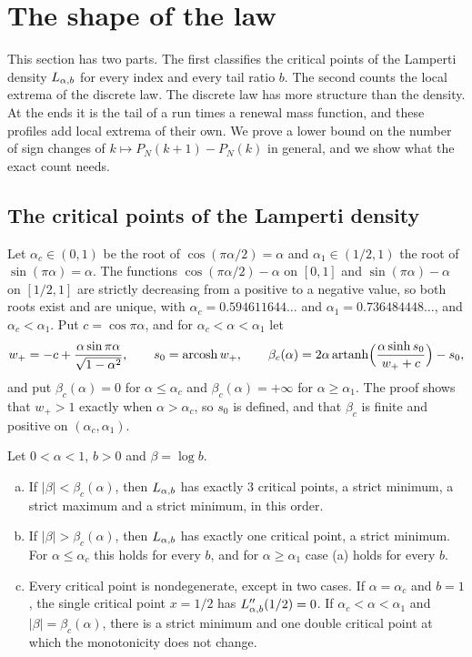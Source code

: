 \section{The shape of the law}\label{sec:shape}

This section has two parts. The first classifies the critical points of the Lamperti density
$L_{\alpha,b}$ for every index and every tail ratio $b$. The second counts the local extrema of the
discrete law. The discrete law has more structure than the density. At the ends it is the
tail of a run times a renewal mass function, and these profiles add local extrema of their
own. We prove a lower bound on the number of sign changes of $k\mapsto P_N(k+1)-P_N(k)$ in
general, and we show what the exact count needs.

\subsection{The critical points of the Lamperti density}\label{sec:critical}

Let $\alpha_c\in(0,1)$ be the root of $\cos(\pi\alpha/2)=\alpha$ and $\alpha_1\in(1/2,1)$ the
root of $\sin(\pi\alpha)=\alpha$. The functions $\cos(\pi\alpha/2)-\alpha$ on $[0,1]$ and
$\sin(\pi\alpha)-\alpha$ on $[1/2,1]$ are strictly decreasing from a positive to a negative
value, so both roots exist and are unique, with
$\alpha_c=0.594611644\ldots$ and $\alpha_1=0.736484448\ldots$, and $\alpha_c<\alpha_1$. Put
$c=\cos\pi\alpha$, and for $\alpha_c<\alpha<\alpha_1$ let
\begin{equation}\label{eq:betac}
 w_{+}=-c+\frac{\alpha\sin\pi\alpha}{\sqrt{1-\alpha^2}},\qquad s_0=\operatorname{arcosh}w_{+},\qquad
 \beta_c(\alpha)=2\alpha\operatorname{artanh}\Bigl(\frac{\alpha\sinh s_0}{w_{+}+c}\Bigr)-s_0 ,
\end{equation}
and put $\beta_c(\alpha)=0$ for $\alpha\le\alpha_c$ and $\beta_c(\alpha)=+\infty$ for
$\alpha\ge\alpha_1$. The proof shows that $w_\plus>1$ exactly when $\alpha>\alpha_c$, so $s_0$ is
defined, and that $\beta_c$ is finite and positive on $(\alpha_c,\alpha_1)$.

\begin{introtheorem}\label{thm:shape}
Let $0<\alpha<1$, $b>0$ and $\beta=\log b$.
\begin{enumerate}[(a)]
\item If $|\beta|<\beta_c(\alpha)$, then $L_{\alpha,b}$ has exactly $3$ critical points, a strict minimum,
a strict maximum and a strict minimum, in this order.
\item If $|\beta|>\beta_c(\alpha)$, then $L_{\alpha,b}$ has exactly one critical point, a strict minimum.
For $\alpha\le\alpha_c$ this holds for every $b$, and for $\alpha\ge\alpha_1$ case (a) holds for
every $b$.
\item Every critical point is nondegenerate, except in two cases. If $\alpha=\alpha_c$ and $b=1$,
the single critical point $x=1/2$ has $L_{\alpha,b}''(1/2)=0$. If $\alpha_c<\alpha<\alpha_1$ and
$|\beta|=\beta_c(\alpha)$, there is a strict minimum and one double critical point at which
the monotonicity does not change.
\end{enumerate}
\end{introtheorem}

